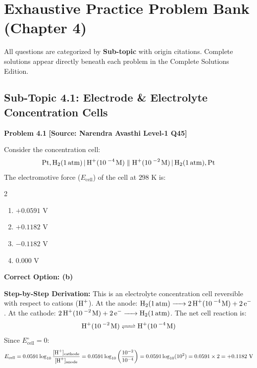 \newpage
\section{Exhaustive Practice Problem Bank (Chapter 4)}
\label{sec:ch04_problem_bank}

\begin{tcolorbox}[enhanced,colback=subtlegreen,colframe=cengagegreen,arc=2mm,boxrule=1pt,title=\textbf{\large Organization of Practice Problems}]
All questions are categorized by \textbf{Sub-topic} with origin citations. Complete solutions appear directly beneath each problem in the Complete Solutions Edition.
\end{tcolorbox}

\subsection{Sub-Topic 4.1: Electrode \& Electrolyte Concentration Cells}

\begin{problembox}
\textbf{Problem 4.1} \hfill \textbf{[Source: Narendra Avasthi Level-1 Q45]}

Consider the concentration cell:
\begin{equation*}
    \ce{Pt, H2(1 atm) | H+(10^{-4} M)} \parallel \ce{H+(10^{-2} M) | H2(1 atm), Pt}
\end{equation*}
The electromotive force ($E_{\text{cell}}$) of the cell at $298\text{ K}$ is:
\begin{multicols}{2}
\begin{enumerate}[label=(\alph*)]
    \item $+0.0591\text{ V}$
    \item $+0.1182\text{ V}$
    \item $-0.1182\text{ V}$
    \item $0.000\text{ V}$
\end{enumerate}
\end{multicols}
\end{problembox}
\begin{solution}
\textbf{Correct Option: (b)}

\textbf{Step-by-Step Derivation:}
This is an electrolyte concentration cell reversible with respect to cations ($\ce{H+}$).
At the anode: $\ce{H2(1 atm) -> 2H+(10^{-4} M) + 2e^-}$.
At the cathode: $\ce{2H+(10^{-2} M) + 2e^- -> H2(1 atm)}$.
The net cell reaction is:
\begin{equation*}
    \ce{H+(10^{-2} M) <=> H+(10^{-4} M)}
\end{equation*}
Since $E^\circ_{\text{cell}} = 0$:
\begin{equation*}
    E_{\text{cell}} = 0.0591 \log_{10} \frac{[\ce{H+}]_{\text{cathode}}}{[\ce{H+}]_{\text{anode}}} = 0.0591 \log_{10} \left(\frac{10^{-2}}{10^{-4}}\right) = 0.0591 \log_{10}(10^2) = 0.0591 \times 2 = +0.1182\text{ V}
\end{equation*}
\end{solution}

